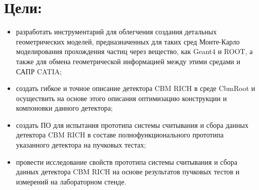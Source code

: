 \section*{Цели:}

\begin{itemize}
\item{разработать инструментарий для облегчения создания детальных геометрических моделей, предназначенных для таких сред Монте-Карло моделирования прохождения частиц через вещество, как Geant4 и ROOT, а также для обмена геометрической информацией между этими средами и САПР CATIA;}
\item{создать гибкое и точное описание детектора CBM RICH в среде CbmRoot и осуществить на основе этого описания оптимизацию конструкции и компоновки данного детектора;}
\item{создать ПО для испытания прототипа системы считывания и сбора данных детектора CBM RICH в составе полнофункционального прототипа указанного детектора на пучковых тестах;}
\item{провести исследование свойств прототипа системы считывания и сбора данных детектора CBM RICH на основе результатов пучковых тестов и измерений на лабораторном стенде.}
\end{itemize}
